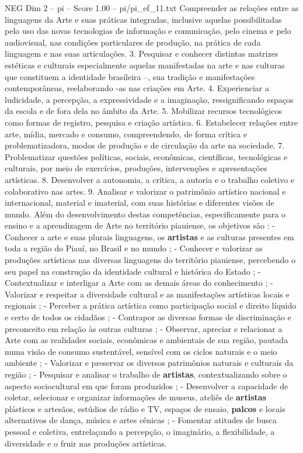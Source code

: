\begin{textsample}{NEG Dim 2 – pi – Score 1.00 – pi/pi\_ef\_11.txt}
Compreender as relações entre as linguagens da Arte e suas práticas integradas, inclusive aquelas possibilitadas pelo uso das novas tecnologias de informação e comunicação, pelo cinema e pelo audiovisual, nas condições particulares de produção, na prática de cada linguagem e nas suas articulações. 3.
Pesquisar e conhecer distintas matrizes estéticas e culturais especialmente aquelas manifestadas na arte e nas culturas que constituem a identidade brasileira –, sua tradição e manifestações contemporâneas, reelaborando -as nas criações em Arte. 4.
Experienciar a ludicidade, a percepção, a expressividade e a imaginação, ressignificando espaços da escola e de fora dela no âmbito da Arte. 5.
Mobilizar recursos tecnológicos como formas de registro, pesquisa e criação artística. 6.
Estabelecer relações entre arte, mídia, mercado e consumo, compreendendo, de forma crítica e problematizadora, modos de produção e de circulação da arte na sociedade. 7.
Problematizar questões políticas, sociais, econômicas, científicas, tecnológicas e culturais, por meio de exercícios, produções, intervenções e apresentações artísticas. 8.
Desenvolver a autonomia, a crítica, a autoria e o trabalho coletivo e colaborativo nas artes. 9.
Analisar e valorizar o patrimônio artístico nacional e internacional, material e imaterial, com suas histórias e diferentes visões de mundo.
Além do desenvolvimento destas competências, especificamente para o ensino e a aprendizagem de Arte no território piauiense, os objetivos são : - Conhecer a arte e suas plurais linguagens, os \textbf{artistas} e as culturas presentes em toda a região do Piauí, no Brasil e no mundo ; - Conhecer e valorizar as produções artísticas nas diversas linguagens do território piauiense, percebendo o seu papel na construção da identidade cultural e histórica do Estado ; - Contextualizar e interligar a Arte com as demais áreas do conhecimento ; - Valorizar e respeitar a diversidade cultural e as manifestações artísticas locais e regionais ; - Perceber a prática artística como participação social e direito líquido e certo de todos os cidadãos ; - Contrapor as diversas formas de discriminação e preconceito em relação às outras culturas ; - Observar, apreciar e relacionar a Arte com as realidades sociais, econômicas e ambientais de sua região, pautada numa visão de consumo sustentável, sensível com os ciclos naturais e o meio ambiente ; - Valorizar e preservar os diversos patrimônios naturais e culturais da região ; - Pesquisar e analisar o trabalho de \textbf{artistas}, contextualizando sobre o aspecto sociocultural em que foram produzidos ; - Desenvolver a capacidade de coletar, selecionar e organizar informações de museus, ateliês de \textbf{artistas} plásticos e artesãos, estúdios de rádio e TV, espaços de ensaio, \textbf{palcos} e locais alternativos de dança, música e artes cênicas ; - Fomentar atitudes de busca pessoal e coletiva, entrelaçando a percepção, o imaginário, a flexibilidade, a diversidade e o fruir nas produções artísticas.

\end{textsample}

